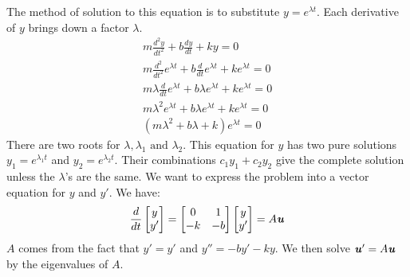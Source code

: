 \documentclass[12pt, letterpaper]{article}
\newcommand{\V}[1]{\textbf{\textit{#1}}}
\theoremstyle{definition}
\begin{document}
	The method of solution to this equation is to substitute $y = e^{\lambda t}$. Each derivative of $y$ brings down a factor $\lambda$.
	\begin{align*}
		m \frac{d^2 y}{dt^2} + b\frac{dy}{dt} + ky = 0 \\
		m \frac{d^2}{dt^2}e^{\lambda t} + b\frac{d}{dt}e^{\lambda t} + ke^{\lambda t} = 0 \\
		m \lambda \frac{d}{dt} e^{\lambda t} + b \lambda e^{\lambda t} + ke^{\lambda t} = 0 \\
		m \lambda^2 e^{\lambda t} + b \lambda e^{\lambda t} + ke^{\lambda t} = 0 \\
		(m \lambda^2  + b \lambda + k)e^{\lambda t} = 0
	\end{align*} 
	There are two roots for $\lambda, \lambda_1 \text{ and } \lambda_2$. This equation for $y$ has two pure solutions $y_1 = e^{\lambda_1 t}$ and $y_2 = e^{\lambda_2 t}$. Their combinations $c_1 y_1 + c_2 y_2$ give the complete solution unless the $\lambda$'s are the same. We want to express the problem into a vector equation for $y$ and $y'$. We have: \begin{equation}
			\frac{d}{dt} \begin{bmatrix} y \\ y'\end{bmatrix} = \begin{bmatrix} 0 & 1\\ -k & -b\end{bmatrix}\begin{bmatrix} y \\ y'\end{bmatrix} = A\V{u}
		\end{equation}$A$ comes from the fact that $y'=y'$ and $y'' = -b y' - ky$. We then solve $\V{u}' = A \V{u}$ by the eigenvalues of $A$.
\end{document}
